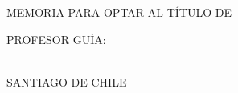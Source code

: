 \begin{center}
\vspace{4cm}

\Memtitle

\vspace{2cm}

MEMORIA PARA OPTAR AL TÍTULO DE\\
\tipomemoria

\vspace{2cm}

\Author

\vspace{1cm}
PROFESOR GUÍA:\\
\Profesor \\
\vspace{1cm}

\vfill
SANTIAGO DE CHILE\\
\Fecha
\end{center}


